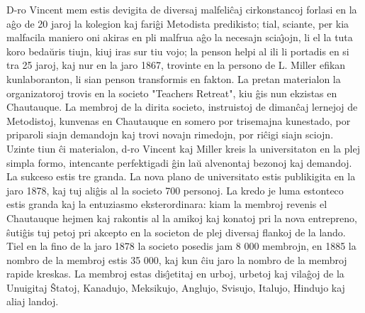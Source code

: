    D-ro Vincent mem estis devigita de diversaj malfeli\^caj cirkonstancoj
forlasi en la a\^go de 20 jaroj la kolegion kaj fari\^gi Metodista
predikisto; tial, sciante, per kia malfacila maniero oni akiras en
pli malfrua a\^go la necesajn scia\^{\j}ojn, li el la tuta koro
beda\u uris tiujn, kiuj iras sur tiu vojo; la penson helpi al ili li
portadis en si tra 25 jaroj, kaj nur en la jaro 1867, trovinte en la
persono de L. Miller efikan kunlaboranton, li sian penson
transformis en fakton. La pretan materialon la organizatoroj trovis
en la societo "Teachers Retreat", kiu \^gis nun ekzistas en
Chautauque. La membroj de la dirita societo, instruistoj de
diman\^caj lernejoj de Metodistoj, kunvenas en Chautauque en somero
por trisemajna kunestado, por priparoli siajn demandojn kaj trovi
novajn rimedojn, por ri\^cigi siajn sciojn. Uzinte tiun \^ci
materialon, d-ro Vincent kaj Miller kreis la universitaton en la
plej simpla formo, intencante perfektigadi \^gin la\u u alvenontaj
bezonoj kaj demandoj. La sukceso estis tre granda. La nova plano de
universitato estis publikigita en la jaro 1878, kaj tuj ali\^gis al
la societo 700 personoj. La kredo je luma estonteco estis granda kaj
la entuziasmo eksterordinara: kiam la membroj revenis el Chautauque
hejmen kaj rakontis al la amikoj kaj konatoj pri la nova entrepreno,
\^suti\^gis tuj petoj pri akcepto en la societon de plej diversaj
flankoj de la lando. Tiel en la fino de la jaro 1878 la societo
posedis jam 8 000 membrojn, en 1885 la nombro de la membroj estis 35
000, kaj kun \^ciu jaro la nombro de la membroj rapide kreskas. La
membroj estas dis\^{\j}etitaj en urboj, urbetoj kaj vila\^goj de la
Unuigitaj \^Statoj, Kanadujo, Meksikujo, Anglujo, Svisujo, Italujo,
Hindujo kaj aliaj landoj.

